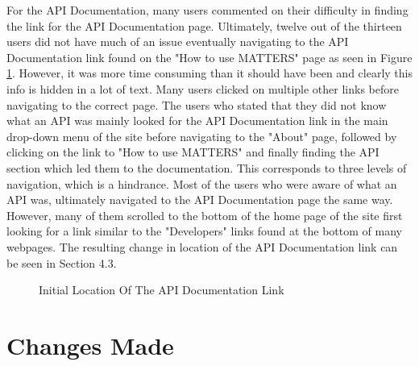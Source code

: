 		For the API Documentation, many users commented on their difficulty in finding 
		the link for the API Documentation page. Ultimately, twelve out of the thirteen 
		users did not have much of an issue eventually navigating to the API Documentation 
		link found on the "How to use MATTERS" page as seen in Figure \ref{fig:how}. However, it was more 
		time consuming than it should have been and clearly this info is hidden in a lot of text. Many users clicked on multiple other 
		links before navigating to the correct page. The users who stated that they did not 
		know what an API was mainly looked for the API Documentation link in the main drop-down 
		menu of the site before navigating to the "About" page, followed by clicking on the 
		link to "How to use MATTERS" and finally finding the API section which led them to 
		the documentation. This corresponds to three levels of navigation, which is a hindrance. Most of the users who were aware of what an API was, ultimately 
		navigated to the API Documentation page the same way. However, many of them scrolled 
		to the bottom of the home page of the site first looking for a link similar to the "Developers" 
		links found at the bottom of many webpages. The resulting change in location of the API Documentation link can be seen in Section 4.3.
		
			\begin{figure}[t]
				\centering
				\caption{Initial Location Of The API Documentation Link}
				\label{fig:how}
			\end{figure}
		
	\section{Changes Made}


